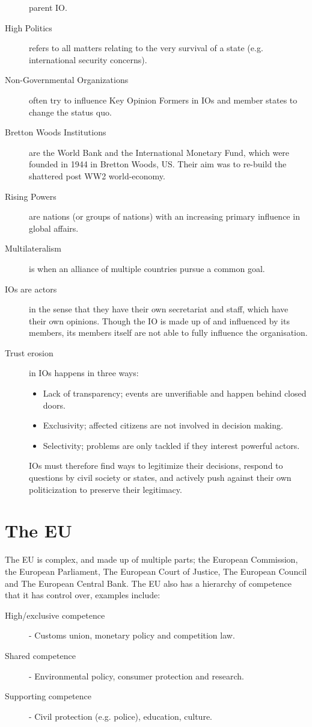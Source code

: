 \begin{description}
    parent IO.
  \item[High Politics] refers to all matters relating to the very
    survival of a state (e.g. international security concerns).
  \item[Non-Governmental Organizations] often try to influence Key
    Opinion Formers in IOs and member states to change the status quo.
  \item[Bretton Woods Institutions] are the World Bank and the
    International Monetary Fund, which were founded in 1944 in Bretton
    Woods, US. Their aim was to re-build the shattered post WW2
    world-economy.
  \item[Rising Powers] are nations (or groups of nations) with an
    increasing primary influence in global affairs.
  \item[Multilateralism] is when an alliance of multiple countries
    pursue a common goal.
  \item[IOs are actors] in the sense that they have their own
    secretariat and staff, which have their own opinions. Though the
    IO is made up of and influenced by its members, its members itself
    are not able to fully influence the organisation.
  \item[Trust erosion] in IOs happens in three ways:
    \begin{itemize}
      \item Lack of transparency; events are unverifiable and happen
        behind closed doors.
      \item Exclusivity; affected citizens are not involved in
        decision making.
      \item Selectivity; problems are only tackled if they interest
        powerful actors.
    \end{itemize}
    IOs must therefore find ways to legitimize their decisions,
    respond to questions by civil society or states, and actively push
    against their own politicization to preserve their legitimacy.
\end{description}


\section{The EU}

The EU is complex, and made up of multiple parts; the European
Commission, the European Parliament, The European Court of Justice,
The European Council and The European Central Bank. The EU also has a
hierarchy of competence that it has control over, examples include:
\begin{description}
  \item[High/exclusive competence]- Customs union, monetary policy and
    competition law.
  \item[Shared competence] - Environmental policy, consumer protection
    and research.
  \item[Supporting competence] - Civil protection (e.g. police),
    education, culture.
\end{description}

